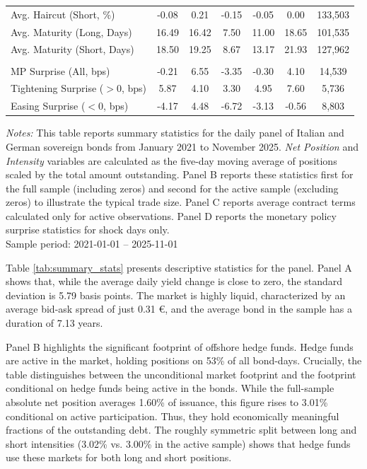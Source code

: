 \documentclass[english, 11pt, oneside]{article}
\begin{document}
\begin{table}[t]
\begin{tabular}{lcccccc}
Avg. Haircut (Short, \%) & -0.08 & 0.21 & -0.15 & -0.05 & 0.00 & 133,503 \\
Avg. Maturity (Long, Days) & 16.49 & 16.42 & 7.50 & 11.00 & 18.65 & 101,535 \\
Avg. Maturity (Short, Days) & 18.50 & 19.25 & 8.67 & 13.17 & 21.93 & 127,962 \\
\addlinespace
\multicolumn{7}{l}{\textit{Panel D: Monetary Policy Shocks (Shock days only)}} \\
MP Surprise (All, bps) & -0.21 & 6.55 & -3.35 & -0.30 & 4.10 & 14,539 \\
Tightening Surprise ($>0$, bps) & 5.87 & 4.10 & 3.30 & 4.95 & 7.60 & 5,736 \\
Easing Surprise ($<0$, bps) & -4.17 & 4.48 & -6.72 & -3.13 & -0.56 & 8,803 \\
\bottomrule
\end{tabular}

\vspace{1ex}
\raggedright\scriptsize
\textit{Notes:} This table reports summary statistics for the daily panel of Italian and German sovereign bonds from January 2021 to November 2025. \textit{Net Position} and \textit{Intensity} variables are calculated as the five-day moving average of positions scaled by the total amount outstanding. Panel B reports these statistics first for the full sample (including zeros) and second for the active sample (excluding zeros) to illustrate the typical trade size. Panel C reports average contract terms calculated only for active observations. Panel D reports the monetary policy surprise statistics for shock days only. \\ Sample period: 2021-01-01 -- 2025-11-01
\end{table}


Table \ref{tab:summary_stats} presents descriptive statistics for the panel. Panel A shows that, while the average daily yield change is close to zero, the standard deviation is 5.79 basis points. The market is highly liquid, characterized by an average bid-ask spread of just 0.31 \euro, and the average bond in the sample has a duration of 7.13 years.

Panel B highlights the significant footprint of offshore hedge funds. Hedge funds are active in the market, holding positions on 53\% of all bond-days. Crucially, the table distinguishes between the unconditional market footprint and the footprint conditional on hedge funds being active in the bonds. While the full-sample absolute net position averages 1.60\% of issuance, this figure rises to 3.01\% conditional on active participation. Thus, they hold economically meaningful fractions of the outstanding debt. The roughly symmetric split between long and short intensities (3.02\% vs. 3.00\% in the active sample) shows that hedge funds use these markets for both long and short positions.
\end{document}

